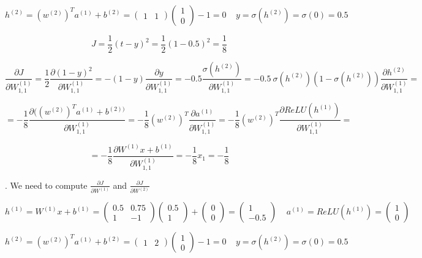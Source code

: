 $$ h^{(2)} = (w^{(2)})^T a^{(1)} + b^{(2)} = \begin{pmatrix} 1 & 1 \end{pmatrix} \begin{pmatrix} 1 \\ 0 \end{pmatrix} - 1 = 0  ~~~~~ y = \sigma(h^{(2)}) = \sigma(0) = 0.5 $$

$$ J = \frac{1}{2} (t - y)^2 = \frac{1}{2} (1 - 0.5)^2 = \frac{1}{8} $$

$$ \frac{\partial J}{\partial W_{1, 1}^{(1)}} = \frac{1}{2} \frac{\partial (1 - y)^2}{\partial W_{1, 1}^{(1)}} = 
-(1 - y) \frac{\partial y}{\partial W_{1, 1}^{(1)}} = -0.5 \frac{\sigma(h^{(2)})}{\partial W_{1, 1}^{(1)}} = -0.5~  \sigma(h^{(2)}) (1 - \sigma(h^{(2)})) \frac{ \partial h^{(2)} }{\partial W_{1, 1}^{(1)}} =  $$

$$ = -\frac{1}{8} \frac{\partial ( (w^{(2)})^T a^{(1)} + b^{(2) ) }}{\partial W_{1, 1}^{(1)}} =  -\frac{1}{8}(w^{(2)})^T \frac{\partial a^{(1)}}{\partial W_{1, 1}^{(1)}} = -\frac{1}{8}(w^{(2)})^T \frac{\partial ReLU(h^{(1)})}{\partial W_{1, 1}^{(1)}} =  $$

$$ = -\frac{1}{8} \frac{\partial W^{(1)}x + b^{(1)}}{\partial W_{1, 1}^{(1)}} = -\frac{1}{8} x_1  = -\frac{1}{8} $$



. We need to compute $ \frac{\partial J}{\partial W^{(1)}}$ and $\frac{\partial J}{\partial W^{(2)}} $

$$ h^{(1)} = W^{(1)}x + b^{(1)} = \begin{pmatrix} 0.5 & 0.75 \\ 1 & -1  \end{pmatrix} \begin{pmatrix} 0.5 \\ 1 \end{pmatrix} + \begin{pmatrix} 0 \\ 0 \end{pmatrix} = \begin{pmatrix} 1 \\ -0.5 \end{pmatrix} ~~~~~  a^{(1)} = ReLU (h^{(1)}) = \begin{pmatrix} 1 \\ 0 \end{pmatrix} $$

$$ h^{(2)} = (w^{(2)})^T a^{(1)} + b^{(2)} = \begin{pmatrix} 1 & 2 \end{pmatrix} \begin{pmatrix} 1 \\ 0 \end{pmatrix} - 1 = 0  ~~~~~ y = \sigma(h^{(2)}) = \sigma(0) = 0.5 $$

